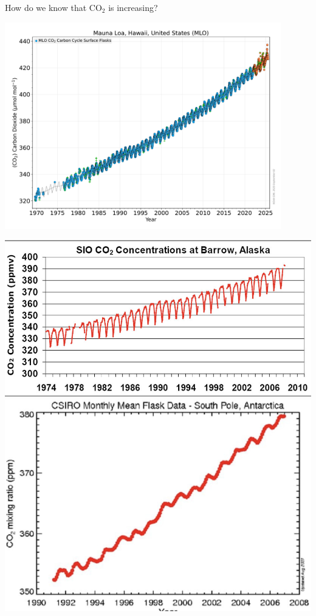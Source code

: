 \documentclass[12pt]{beamer}
\begin{document}
\begin{frame}{How do we know that $\text{CO}_2$ is increasing?}

\begin{center}
\begin{minipage}{0.62\textwidth}
\vspace{0pt}
\includegraphics[width=0.9\textwidth]{images/mauna-loa-data_2025-09-01.pdf}
\end{minipage} %
\hfill %
\begin{minipage}{0.35\textwidth}
\vspace{0pt}
\includegraphics[width=\textwidth]{images/co2_alaska.png}\\[12pt]
\includegraphics[width=\textwidth]{images/co2_antartica.png}
\end{minipage}
\end{center}
%



\end{frame}
\end{document}
